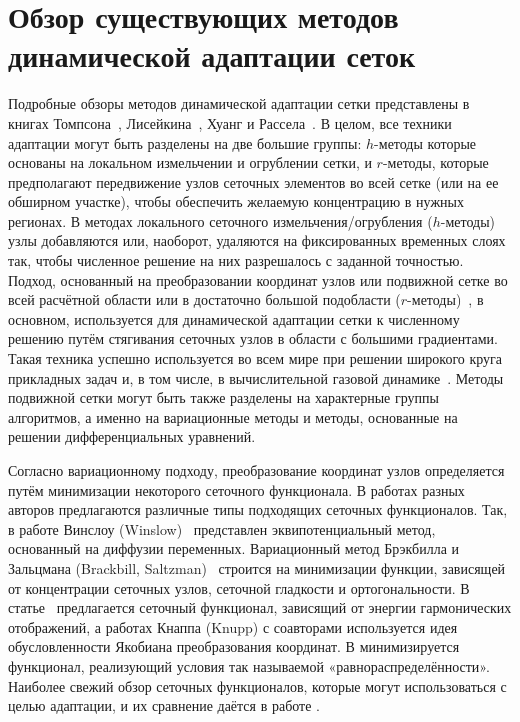 \chapter{Обзор существующих методов динамической адаптации сеток} \label{ch:ch1}

Подробные обзоры методов динамической адаптации сетки представлены в книгах Томпсона~\cite{thompson_handbook_1998}, Лисейкина~\cite{liseikin2009grid}, Хуанг и Рассела~\cite{huang_adaptive_2011}. В целом, все техники адаптации могут быть разделены на две большие группы: $h$-методы которые основаны на локальном измельчении и огрублении сетки, и $r$-методы, которые предполагают передвижение узлов сеточных элементов во всей сетке (или на ее обширном участке), чтобы обеспечить желаемую концентрацию в нужных регионах. В методах локального сеточного измельчения/огрубления ($h$-методы)~\cite{adjerid_high-order_1992,eriksson_adaptive_1991,babuska_p-and_1990} узлы добавляются или, наоборот, удаляются на фиксированных временных слоях так, чтобы численное решение на них разрешалось с заданной точностью. Подход, основанный на преобразовании координат узлов или подвижной сетке во всей расчётной области или в достаточно большой подобласти ($r$-методы)~\cite{huang_adaptive_2011}, в основном, используется для динамической адаптации сетки к численному решению путём стягивания сеточных узлов в области с большими градиентами. Такая техника успешно используется во всем мире при решении широкого круга прикладных задач и, в том числе, в вычислительной газовой динамике~\cite{baker_mesh_1997,breslavskii_dynamic_2008,yanenko_methods_1976}. 
Методы подвижной сетки могут быть также разделены на характерные группы алгоритмов, а именно на вариационные методы и методы, основанные на решении дифференциальных уравнений.

	Согласно вариационному подходу, преобразование координат узлов определяется путём минимизации некоторого сеточного функционала. В работах разных авторов предлагаются различные типы подходящих сеточных функционалов. Так, в работе Винслоу (Winslow)~\cite{winslow_adaptive-mesh_1981} представлен эквипотенциальный метод, основанный на диффузии переменных. Вариационный метод Брэкбилла и Зальцмана (Brackbill, Saltzman)~\cite{brackbill_adaptive_1982}  строится на минимизации функции, зависящей от концентрации сеточных узлов, сеточной гладкости и ортогональности. В статье~\cite{dvinsky_adaptive_1991}  предлагается сеточный функционал, зависящий от энергии гармонических отображений, а работах Кнаппа (Knupp) с соавторами \cite{knupp_jacobian-weighted_1996, knupp_framework_2000}  используется идея обусловленности Якобиана преобразования координат. В \cite{huang_variational_2001}  минимизируется функционал, реализующий условия так называемой «равнораспределённости». Наиболее свежий обзор сеточных функционалов, которые могут использоваться с целью адаптации, и их сравнение даётся в работе \cite{huang_comparative_2015}.
	
